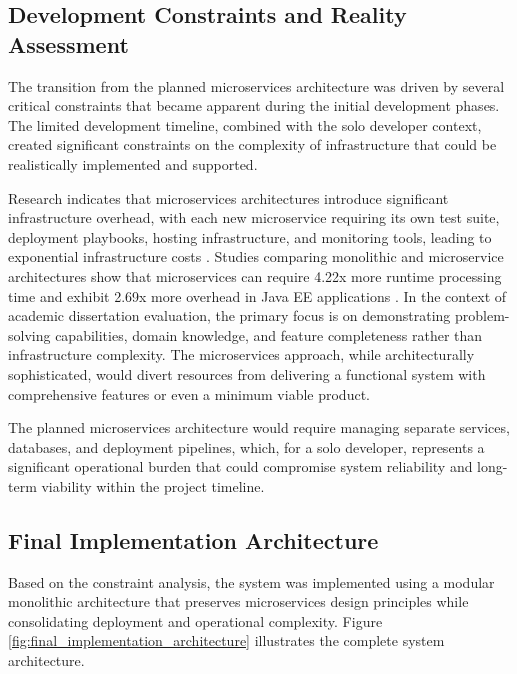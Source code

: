 \subsection{Development Constraints and Reality Assessment}

The transition from the planned microservices architecture was driven by several critical constraints that became apparent during the initial development phases. The limited development timeline, combined with the solo developer context, created significant constraints on the complexity of infrastructure that could be realistically implemented and supported.

Research indicates that microservices architectures introduce significant infrastructure overhead, with each new microservice requiring its own test suite, deployment playbooks, hosting infrastructure, and monitoring tools, leading to exponential infrastructure costs \cite{ServiceCostOverhead2023}. Studies comparing monolithic and microservice architectures show that microservices can require 4.22x more runtime processing time and exhibit 2.69x more overhead in Java EE applications \cite{MonolithicVsMicroservices2020}. In the context of academic dissertation evaluation, the primary focus is on demonstrating problem-solving capabilities, domain knowledge, and feature completeness rather than infrastructure complexity. The microservices approach, while architecturally sophisticated, would divert resources from delivering a functional system with comprehensive features or even a minimum viable product.

The planned microservices architecture would require managing separate services, databases, and deployment pipelines, which, for a solo developer, represents a significant operational burden that could compromise system reliability and long-term viability within the project timeline.

\subsection{Final Implementation Architecture}

Based on the constraint analysis, the system was implemented using a modular monolithic architecture that preserves microservices design principles while consolidating deployment and operational complexity. Figure \ref{fig:final_implementation_architecture} illustrates the complete system architecture.

